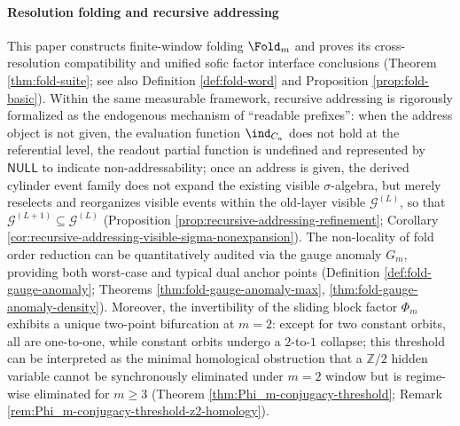 \paragraph{Resolution folding and recursive addressing}
This paper constructs finite-window folding \(\Fold_m\) and proves its cross-resolution compatibility and unified sofic factor interface conclusions (Theorem \ref{thm:fold-suite}; see also Definition \ref{def:fold-word} and Proposition \ref{prop:fold-basic}). Within the same measurable framework, recursive addressing is rigorously formalized as the endogenous mechanism of ``readable prefixes'': when the address object is not given, the evaluation function \(\ind_{C_a}\) does not hold at the referential level, the readout partial function is undefined and represented by \(\mathsf{NULL}\) to indicate non-addressability; once an address is given, the derived cylinder event family does not expand the existing visible \(\sigma\)-algebra, but merely reselects and reorganizes visible events within the old-layer visible \(\mathcal{G}^{(L)}\), so that \(\mathcal{G}^{(L+1)}\subseteq \mathcal{G}^{(L)}\) (Proposition \ref{prop:recursive-addressing-refinement}; Corollary \ref{cor:recursive-addressing-visible-sigma-nonexpansion}). The non-locality of fold order reduction can be quantitatively audited via the gauge anomaly \(G_m\), providing both worst-case and typical dual anchor points (Definition \ref{def:fold-gauge-anomaly}; Theorems \ref{thm:fold-gauge-anomaly-max}, \ref{thm:fold-gauge-anomaly-density}).
Moreover, the invertibility of the sliding block factor \(\Phi_m\) exhibits a unique two-point bifurcation at \(m=2\): except for two constant orbits, all are one-to-one, while constant orbits undergo a \(2\)-to-\(1\) collapse; this threshold can be interpreted as the minimal homological obstruction that a \(\mathbb{Z}/2\) hidden variable cannot be synchronously eliminated under \(m=2\) window but is regime-wise eliminated for \(m\ge 3\) (Theorem \ref{thm:Phi_m-conjugacy-threshold}; Remark \ref{rem:Phi_m-conjugacy-threshold-z2-homology}).

